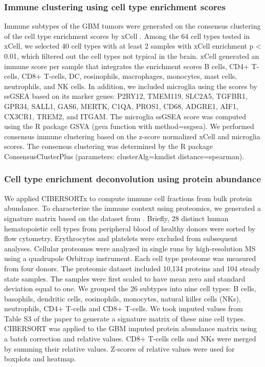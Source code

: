 \subsubsection{Immune clustering using cell type enrichment scores}
Immune subtypes of the GBM tumors were generated on the consensus clustering of the cell type enrichment scores by xCell \cite{wilkersonmd_hayesdn:ConsensusClusterPlusClass2010}. Among the 64 cell types tested in xCell, we selected 40 cell types with at least 2 samples with xCell enrichment p < 0.01, which filtered out the cell types not typical in the brain. xCell generated an immune score per sample that integrates the enrichment scores B cells, CD4+ T-cells, CD8+ T-cells, DC, eosinophils, macrophages, monocytes, mast cells, neutrophils, and NK cells. In addition, we included microglia using the scores by ssGSEA based on its marker genes: P2RY12, TMEM119, SLC2A5, TGFBR1, GPR34, SALL1, GAS6, MERTK, C1QA, PROS1, CD68, ADGRE1, AIF1, CX3CR1, TREM2, and ITGAM. The microglia ssGSEA score was computed using the R package GSVA (gsva function with method=\textquotedbl{}ssgsea\textquotedbl{}). We performed consensus immune clustering based on the z-score normalized xCell and microglia scores. The consensus clustering was determined by the R package ConsensusClusterPlus (parameters: clusterAlg=\textquotedbl{}kmdist\textquotedbl{} distance=\textquotedbl{}spearman\textquotedbl{}).


\subsubsection{Cell type enrichment deconvolution using protein abundance}
We applied CIBERSORTx \cite{newmanam_alizadehaa:DeterminingCell2019} to compute immune cell fractions from bulk protein abundance. To characterize the immune context using proteomics, we generated a signature matrix based on the dataset from \cite{rieckmannjc_meissnerf:SocialNetwork2017}. Briefly, 28 distinct human hematopoietic cell types from peripheral blood of healthy donors were sorted by flow cytometry. Erythrocytes and platelets were excluded from subsequent analyses. Cellular proteomes were analyzed in single runs by high-resolution MS using a quadrupole Orbitrap instrument. Each cell type proteome was measured from four donors. The proteomic dataset included 10,134 proteins and 104 steady state samples. The samples were first scaled to have mean zero and standard deviation equal to one. We grouped the 26 subtypes into nine cell types: B cells, basophils, dendritic cells, eosinophils, monocytes, natural killer cells (NKs), neutrophils, CD4+ T-cells and CD8+ T-cells. We took imputed values from Table S3 of the \citeauthor{newmanam_alizadehaa:DeterminingCell2019} paper to generate a signature matrix of these nine cell types. CIBERSORT was applied to the GBM imputed protein abundance matrix using a batch correction and relative values. CD8+ T-cells cells and NKs were merged by summing their relative values. Z-scores of relative values were used for boxplots and heatmap.

